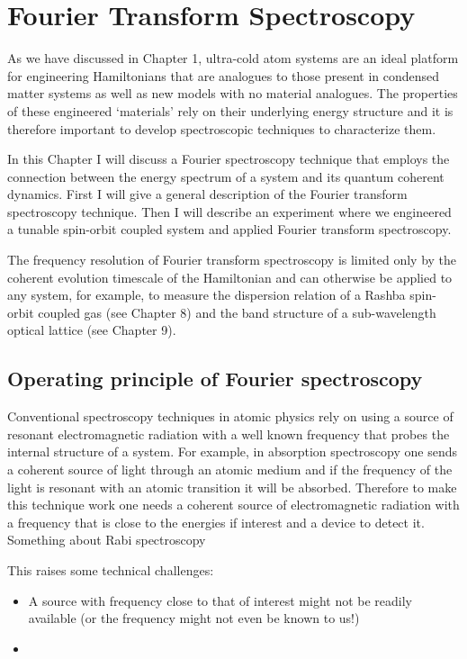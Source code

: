 
\renewcommand{\thechapter}{5}

\chapter{Fourier Transform Spectroscopy}

As we have discussed in Chapter 1, ultra-cold atom systems are an ideal platform for engineering Hamiltonians that are analogues to those present in condensed matter systems as well as new models with no material analogues. The properties of these engineered `materials' rely on their underlying energy structure and it is therefore important to develop spectroscopic techniques to characterize them. 

In this Chapter I will discuss a Fourier spectroscopy technique that employs the connection between the energy spectrum of a system and its quantum coherent dynamics. First I will give a general description of the Fourier transform spectroscopy technique. Then I will describe an experiment where we engineered a tunable spin-orbit coupled system and applied Fourier transform spectroscopy. 

The frequency resolution of Fourier transform spectroscopy is limited only by the coherent evolution timescale of the Hamiltonian and can otherwise be applied to any system, for example, to measure the dispersion relation of a Rashba spin-orbit coupled gas (see Chapter 8) and the band structure of a sub-wavelength optical lattice (see Chapter 9).

\section{Operating principle of Fourier spectroscopy}

Conventional spectroscopy techniques in atomic physics rely on using 
a source of resonant electromagnetic radiation with a well known frequency that probes the internal structure of a system. For example, in absorption spectroscopy one sends a coherent source of light through an atomic medium and if the frequency of the light is resonant with an atomic transition it will be absorbed. Therefore to make this technique work one needs a coherent source of electromagnetic radiation with a frequency that is close to the energies if interest and a device to detect it. Something about Rabi spectroscopy   

This raises some technical challenges: 
\begin{itemize}
  \item A source with frequency close to that of interest might not be readily available (or the frequency might not even be known to us!)
  \item  
 \end{itemize}		



